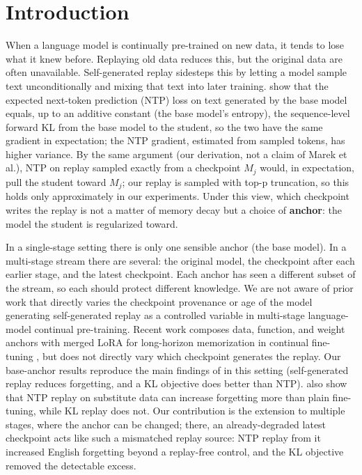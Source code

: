 \documentclass[11pt]{article}
\begin{document}
\section{Introduction}

When a language model is continually pre-trained on new data, it tends to lose what it knew before. Replaying old data reduces this, but the original data are often unavailable. Self-generated replay sidesteps this by letting a model sample text unconditionally and mixing that text into later training. \citet[Eq.~1]{marek2026} show that the expected next-token prediction (NTP) loss on text generated by the base model equals, up to an additive constant (the base model's entropy), the sequence-level forward KL from the base model to the student, so the two have the same gradient in expectation; the NTP gradient, estimated from sampled tokens, has higher variance. By the same argument (our derivation, not a claim of Marek et al.), NTP on replay sampled exactly from a checkpoint $M_j$ would, in expectation, pull the student toward $M_j$; our replay is sampled with top-p truncation, so this holds only approximately in our experiments. Under this view, which checkpoint writes the replay is not a matter of memory decay but a choice of \textbf{anchor}: the model the student is regularized toward.

In a single-stage setting there is only one sensible anchor (the base model). In a multi-stage stream there are several: the original model, the checkpoint after each earlier stage, and the latest checkpoint. Each anchor has seen a different subset of the stream, so each should protect different knowledge. We are not aware of prior work that directly varies the checkpoint provenance or age of the model generating self-generated replay as a controlled variable in multi-stage language-model continual pre-training. Recent work composes data, function, and weight anchors with merged LoRA for long-horizon memorization in continual fine-tuning \citep{zhang2026}, but does not directly vary which checkpoint generates the replay. Our base-anchor results reproduce the main findings of \citet{marek2026} in this setting (self-generated replay reduces forgetting, and a KL objective does better than NTP). \citet[Fig.~9]{marek2026} also show that NTP replay on substitute data can increase forgetting more than plain fine-tuning, while KL replay does not. Our contribution is the extension to multiple stages, where the anchor can be changed; there, an already-degraded latest checkpoint acts like such a mismatched replay source: NTP replay from it increased English forgetting beyond a replay-free control, and the KL objective removed the detectable excess.
\end{document}
